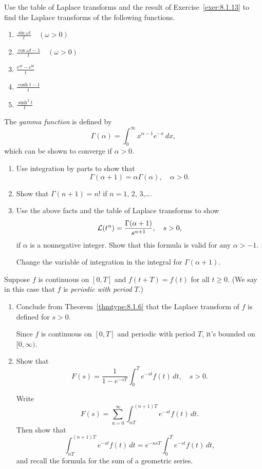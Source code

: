 \documentclass{ximera}
\begin{document}
\begin{problem}\label{exer:8.1.15}
Use the table of Laplace transforms and the result of
Exercise~\ref{exer:8.1.13} to find the Laplace transforms of the following
functions.

\begin{enumerate}
    \item $\frac{\sin\omega t}{t}\quad(\omega>0)$
    \item $\frac{\cos\omega t-1}{t}\quad (\omega>0)$
    \item $\frac{e^{at}-e^{bt}}{t}$
    \item $\frac{\cosh t-1}{t}$
    \item $\frac{\sinh^2 t}{t}$
\end{enumerate}
\end{problem}

\begin{problem}\label{exer:8.1.16}
  The \emph{gamma function} is defined by
$$
\Gamma (\alpha)=\int_0^\infty x^{\alpha-1}e^{-x}\,dx,
$$
which can be shown to converge if $\alpha>0$.

\begin{enumerate}
\item %
 Use integration by parts to show that
$$
\Gamma (\alpha+1)=\alpha\Gamma (\alpha),\quad\alpha>0.
$$
\item %
 Show that $\Gamma(n+1)=n!$ if $n=1$, $2$, $3$,\dots.
\item %
 Use the above facts and the table of Laplace transforms to show
$$
{\cal L}(t^\alpha)=\frac{\Gamma (\alpha+1)}{s^{\alpha+1}},\quad s>0,
$$
if $\alpha$ is a nonnegative integer.  Show that this formula is valid for
any $\alpha>-1$.
\begin{hint}
Change the variable of integration in the
integral for $\Gamma (\alpha+1)$.
\end{hint}
\end{enumerate}
\end{problem}

\begin{problem}\label{exer:8.1.17}
  Suppose $f$ is continuous on $[0, T]$ and $f(t+T)=f(t)$
for all $t\ge 0$.  (We say in this case that $f$ is \emph{periodic with
period\/} $T$.)
\begin{enumerate}
\item %
 Conclude from Theorem~\ref{thmtype:8.1.6} that the Laplace transform of
$f$ is defined for $s>0$. 
\begin{hint}
   Since $f$ is
continuous on $[0,T]$ and periodic with period $T$, it's bounded
on $[0,\infty)$. 
\end{hint}
\item\label{exer:8.1.17b} %
Show that
$$
F(s)=\frac{1}{1-e^{-sT}}\int_0^T e^{-st}f(t)\,dt,\quad s>0.
$$
\begin{hint}
    Write
$$
F(s)=\sum^\infty_{n=0}\int^{(n+1)T}_{nT}e^{-st} f(t)\,dt.
$$
Then show that
$$
\int^{(n+1)T}_{nT} e^{-st}f(t)\,dt=e^{-nsT}\int_0^T e^{-st}f(t)\,dt,
$$
and recall the formula for the sum of a geometric series.
\end{hint}
\end{enumerate}
\end{problem}
\end{document}
